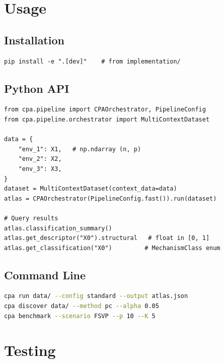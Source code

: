 \documentclass[11pt]{article}
\begin{document}
\section{Usage}

\subsection{Installation}

\begin{lstlisting}
pip install -e ".[dev]"    # from implementation/
\end{lstlisting}

\subsection{Python API}

\begin{lstlisting}
from cpa.pipeline import CPAOrchestrator, PipelineConfig
from cpa.pipeline.orchestrator import MultiContextDataset

data = {
    "env_1": X1,   # np.ndarray (n, p)
    "env_2": X2,
    "env_3": X3,
}
dataset = MultiContextDataset(context_data=data)
atlas = CPAOrchestrator(PipelineConfig.fast()).run(dataset)

# Query results
atlas.classification_summary()
atlas.get_descriptor("X0").structural   # float in [0, 1]
atlas.get_classification("X0")         # MechanismClass enum
\end{lstlisting}

\subsection{Command Line}

\begin{lstlisting}[language=bash]
cpa run data/ --config standard --output atlas.json
cpa discover data/ --method pc --alpha 0.05
cpa benchmark --scenario FSVP --p 10 --K 5
\end{lstlisting}

\section{Testing}
\end{document}
